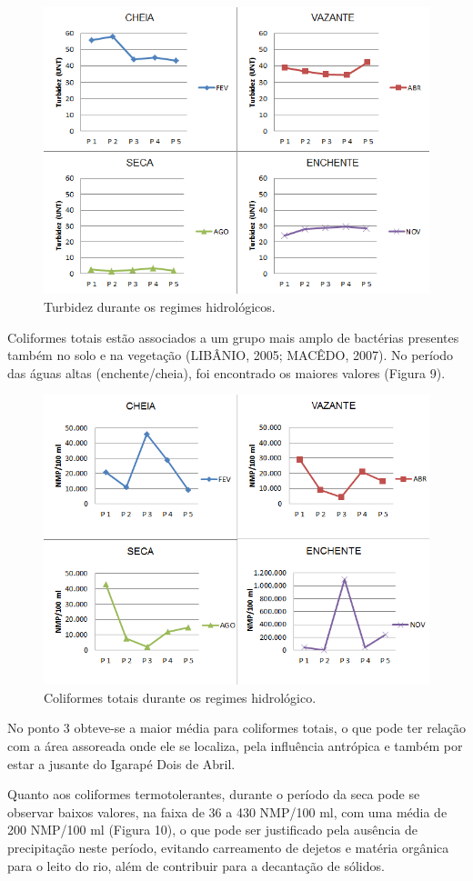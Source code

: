 \documentclass[article,12pt,onesidea,4paper,english,brazil]{abntex2}
\begin{document}
\begin{figure}[!h]
	\centering
	\includegraphics[width=0.8\linewidth]{pip-137-08}
	\caption{Turbidez durante os regimes hidrológicos.}
\end{figure}

Coliformes totais estão associados a um grupo mais amplo de bactérias presentes também no solo e na vegetação (LIBÂNIO, 2005; MACÊDO, 2007). No período das águas altas (enchente/cheia), foi encontrado os maiores valores (Figura 9).

\begin{figure}[!h]
	\centering
	\includegraphics[width=0.8\linewidth]{pip-137-09}
	\caption{Coliformes totais durante os regimes hidrológico.}
\end{figure}

No ponto 3 obteve-se a maior média para coliformes totais, o que pode ter relação com a área assoreada onde ele se localiza, pela influência antrópica e também por estar a jusante do Igarapé Dois de Abril.

Quanto aos coliformes termotolerantes, durante o período da seca pode se observar baixos valores, na faixa de 36 a 430 NMP/100 ml, com uma média de 200 NMP/100 ml (Figura 10), o que pode ser justificado pela ausência de precipitação neste período, evitando carreamento de dejetos e matéria orgânica para o leito do rio, além de contribuir para a decantação de sólidos.
\end{document}
